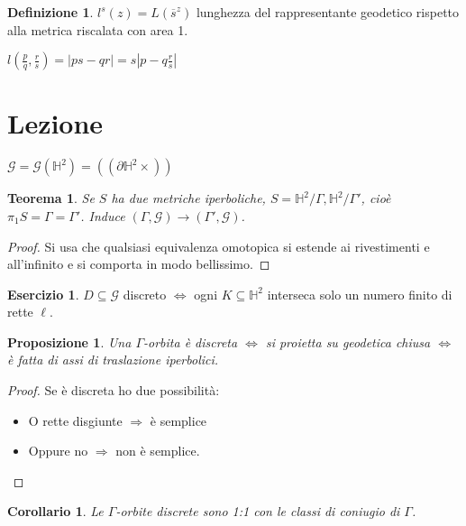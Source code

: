 \documentclass[a4paper]{article}
\newtheorem{theorem}{Teorema}
\newtheorem{proposition}{Proposizione}
\newtheorem{corollary}{Corollario}
\theoremstyle{definition}
\newtheorem{definition}{Definizione}
\newtheorem{exercise}{Esercizio}
\begin{document}
    \begin{definition}
        $l^s(z) = L(\overline{s}^z)$ lunghezza del rappresentante geodetico rispetto alla metrica riscalata con area 1. 
    \end{definition}
    $ l(\frac{p}{q}, \frac{r}{s}) = |ps-qr| = s|p-q \frac{r}{s}|$


\section{Lezione}
    
    $\mathcal G = \mathcal G(\mathbb H^2 ) = \left(\left(\partial \mathbb H^2 \times\right)\right)$ 

    \begin{theorem}
        Se $S$ ha due metriche iperboliche, $S = \mathbb H^2 /\Gamma, \mathbb H^2 /\Gamma'$, cioè $\pi_{1} S = \Gamma = \Gamma'$.
        Induce $(\Gamma, \mathcal G) \xrightarrow{~} (\Gamma', \mathcal G)$.
    \end{theorem}

    \begin{proof}
        Si usa che qualsiasi equivalenza omotopica si estende ai rivestimenti e all'infinito e si comporta in modo bellissimo.
    \end{proof}

    \begin{exercise}
         $D \subseteq \mathcal G$ discreto $\Leftrightarrow$ ogni $K \subseteq \mathbb H^2$ interseca solo un numero finito di rette $\ell$.
    \end{exercise}

    \begin{proposition}
        Una $\Gamma$-orbita è discreta $\Leftrightarrow$ si proietta su geodetica chiusa $\Leftrightarrow$ è fatta di assi di traslazione iperbolici.
    \end{proposition}

    \begin{proof}
        Se è discreta ho due possibilità:
        \begin{itemize}
            \item O rette disgiunte $\Rightarrow$ è semplice
            \item Oppure no $\Rightarrow$ non è semplice.
        \end{itemize}
    \end{proof}

    \begin{corollary}
        Le $\Gamma$-orbite discrete sono 1:1 con le classi di coniugio di $\Gamma$.
    \end{corollary}
    
\end{document}
